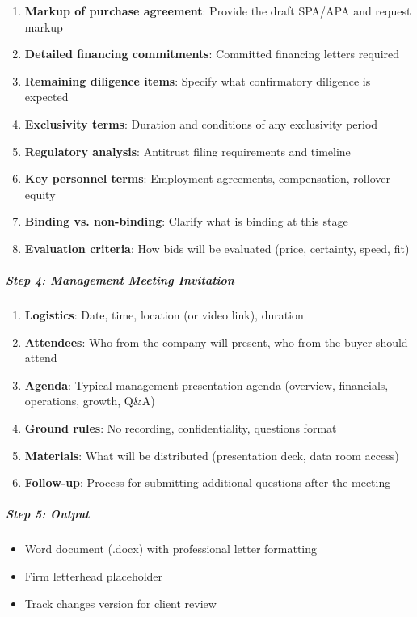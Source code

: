 \documentclass[11pt]{article}
\begin{document}
\begin{enumerate}[leftmargin=*,itemsep=2pt,topsep=2pt]
\item {} \textbf{Markup of purchase agreement}: Provide the draft SPA/APA and request markup
\item {} \textbf{Detailed financing commitments}: Committed financing letters required
\item {} \textbf{Remaining diligence items}: Specify what confirmatory diligence is expected
\item {} \textbf{Exclusivity terms}: Duration and conditions of any exclusivity period
\item {} \textbf{Regulatory analysis}: Antitrust filing requirements and timeline
\item {} \textbf{Key personnel terms}: Employment agreements, compensation, rollover equity
\item {} \textbf{Binding vs. non-binding}: Clarify what is binding at this stage
\item {} \textbf{Evaluation criteria}: How bids will be evaluated (price, certainty, speed, fit)
\end{enumerate}

\subparagraph{Step 4: Management Meeting Invitation}\mbox{}\par

\begin{enumerate}[leftmargin=*,itemsep=2pt,topsep=2pt]
\item {} \textbf{Logistics}: Date, time, location (or video link), duration
\item {} \textbf{Attendees}: Who from the company will present, who from the buyer should attend
\item {} \textbf{Agenda}: Typical management presentation agenda (overview, financials, operations, growth, Q\&A)
\item {} \textbf{Ground rules}: No recording, confidentiality, questions format
\item {} \textbf{Materials}: What will be distributed (presentation deck, data room access)
\item {} \textbf{Follow-up}: Process for submitting additional questions after the meeting
\end{enumerate}

\subparagraph{Step 5: Output}\mbox{}\par

\begin{itemize}[leftmargin=*,itemsep=2pt,topsep=2pt]
\item {} Word document (.docx) with professional letter formatting
\item {} Firm letterhead placeholder
\item {} Track changes version for client review
\end{itemize}
\end{document}
